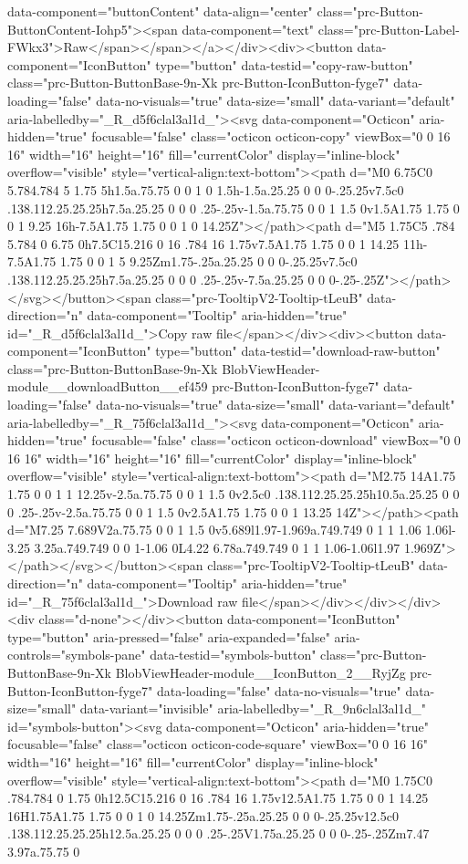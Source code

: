 {{{{{data-component="buttonContent" data-align="center" class="prc-Button-ButtonContent-Iohp5"><span data-component="text" class="prc-Button-Label-FWkx3">Raw</span></span></a></div><div><button data-component="IconButton" type="button" data-testid="copy-raw-button" class="prc-Button-ButtonBase-9n-Xk prc-Button-IconButton-fyge7" data-loading="false" data-no-visuals="true" data-size="small" data-variant="default" aria-labelledby="_R_d5f6clal3al1d_"><svg data-component="Octicon" aria-hidden="true" focusable="false" class="octicon octicon-copy" viewBox="0 0 16 16" width="16" height="16" fill="currentColor" display="inline-block" overflow="visible" style="vertical-align:text-bottom"><path d="M0 6.75C0 5.784.784 5 1.75 5h1.5a.75.75 0 0 1 0 1.5h-1.5a.25.25 0 0 0-.25.25v7.5c0 .138.112.25.25.25h7.5a.25.25 0 0 0 .25-.25v-1.5a.75.75 0 0 1 1.5 0v1.5A1.75 1.75 0 0 1 9.25 16h-7.5A1.75 1.75 0 0 1 0 14.25Z"></path><path d="M5 1.75C5 .784 5.784 0 6.75 0h7.5C15.216 0 16 .784 16 1.75v7.5A1.75 1.75 0 0 1 14.25 11h-7.5A1.75 1.75 0 0 1 5 9.25Zm1.75-.25a.25.25 0 0 0-.25.25v7.5c0 .138.112.25.25.25h7.5a.25.25 0 0 0 .25-.25v-7.5a.25.25 0 0 0-.25-.25Z"></path></svg></button><span class="prc-TooltipV2-Tooltip-tLeuB" data-direction="n" data-component="Tooltip" aria-hidden="true" id="_R_d5f6clal3al1d_">Copy raw file</span></div><div><button data-component="IconButton" type="button" data-testid="download-raw-button" class="prc-Button-ButtonBase-9n-Xk BlobViewHeader-module__downloadButton__ef459 prc-Button-IconButton-fyge7" data-loading="false" data-no-visuals="true" data-size="small" data-variant="default" aria-labelledby="_R_75f6clal3al1d_"><svg data-component="Octicon" aria-hidden="true" focusable="false" class="octicon octicon-download" viewBox="0 0 16 16" width="16" height="16" fill="currentColor" display="inline-block" overflow="visible" style="vertical-align:text-bottom"><path d="M2.75 14A1.75 1.75 0 0 1 1 12.25v-2.5a.75.75 0 0 1 1.5 0v2.5c0 .138.112.25.25.25h10.5a.25.25 0 0 0 .25-.25v-2.5a.75.75 0 0 1 1.5 0v2.5A1.75 1.75 0 0 1 13.25 14Z"></path><path d="M7.25 7.689V2a.75.75 0 0 1 1.5 0v5.689l1.97-1.969a.749.749 0 1 1 1.06 1.06l-3.25 3.25a.749.749 0 0 1-1.06 0L4.22 6.78a.749.749 0 1 1 1.06-1.06l1.97 1.969Z"></path></svg></button><span class="prc-TooltipV2-Tooltip-tLeuB" data-direction="n" data-component="Tooltip" aria-hidden="true" id="_R_75f6clal3al1d_">Download raw file</span></div></div></div><div class="d-none"></div><button data-component="IconButton" type="button" aria-pressed="false" aria-expanded="false" aria-controls="symbols-pane" data-testid="symbols-button" class="prc-Button-ButtonBase-9n-Xk BlobViewHeader-module__IconButton_2__RyjZg prc-Button-IconButton-fyge7" data-loading="false" data-no-visuals="true" data-size="small" data-variant="invisible" aria-labelledby="_R_9n6clal3al1d_" id="symbols-button"><svg data-component="Octicon" aria-hidden="true" focusable="false" class="octicon octicon-code-square" viewBox="0 0 16 16" width="16" height="16" fill="currentColor" display="inline-block" overflow="visible" style="vertical-align:text-bottom"><path d="M0 1.75C0 .784.784 0 1.75 0h12.5C15.216 0 16 .784 16 1.75v12.5A1.75 1.75 0 0 1 14.25 16H1.75A1.75 1.75 0 0 1 0 14.25Zm1.75-.25a.25.25 0 0 0-.25.25v12.5c0 .138.112.25.25.25h12.5a.25.25 0 0 0 .25-.25V1.75a.25.25 0 0 0-.25-.25Zm7.47 3.97a.75.75 0 }}}}}
